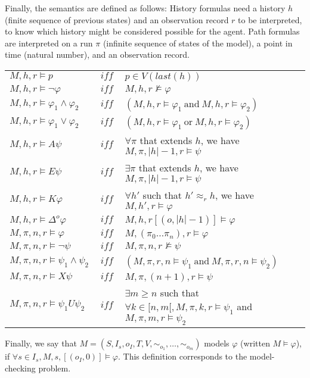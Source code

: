 \documentclass[dvipsnames]{acmart}
\def\A{\mathit{A}}
\def\E{\mathit{E}}
\def\U{\mathit{U}}
\def\X{\mathit{X}}
\def\K{\mathit{K}}
\def\D#1{\Delta^{#1}}
\def\eqh#1{\approx_{#1}}
\def\eqstate#1{\sim_{#1}}
\def\iff{\ \mathit{iff}\ }
\begin{document}
Finally, the semantics are defined as follows:
History formulas need a history $h$ (finite sequence of previous states) and an observation record $r$ to be interpreted, to know which history might be considered possible for the agent.
Path formulas are interpreted on a run $\pi$ (infinite sequence of states of the model), a point in time (natural number), and an observation record.
\begin{table}
\begin{tabular}{l c l}
  $M,h,r \models p $&$ \iff $&$ p\in V(\mathit{last}(h))$\\
  $M,h,r \models \neg\varphi $&$ \iff $&$ M,h,r\not\models\varphi$\\
  $M,h,r \models \varphi_1\wedge\varphi_2 $&$ \iff $&$ (M,h,r\models\varphi_1~\text{and}~ M,h,r\models\varphi_2)$\\
  $M,h,r \models \varphi_1\vee\varphi_2 $&$ \iff $&$ (M,h,r\models\varphi_1~\text{or}~ M,h,r\models\varphi_2)$\\
  $M,h,r \models \A\psi  $&$ \iff $&$ \forall\pi$ that extends $h$, we have $M,\pi,|h|-1,r\models\psi$\\
  $M,h,r \models \E\psi  $&$ \iff $&$ \exists\pi$ that extends $h$, we have $M,\pi,|h|-1,r\models\psi$\\
  $M,h,r \models\K\varphi  $&$ \iff $&$ \forall h'$ such that $h'\eqh{r}h$, we have $M,h',r\models\varphi$\\
  $M,h,r \models \D{o}\varphi $&$ \iff $&$ M,h,r[(o,|h|-1)]\models\varphi$\\
  $M,\pi,n,r\models\varphi $&$ \iff $&$ M,(\pi_0\dots\pi_n),r\models\varphi$\\
  $M,\pi,n,r\models\neg\psi $&$ \iff $&$ M,\pi,n,r\not\models\psi$\\
  $M,\pi,n,r\models \psi_1\wedge\psi_2 $&$ \iff $&$ (M,\pi,r,n\models\psi_1~\text{and}~ M,\pi,r,n\models\psi_2)$\\
  $M,\pi,n,r\models\X\psi $&$ \iff $&$  M,\pi,(n+1),r\models\psi$\\
  $M,\pi,n,r\models \psi_1\U\psi_2 $&$ \iff $&$ \exists m\geq n$ such that $\forall k\in[n,m[, M,\pi,k,r\models\psi_1$ and $M,\pi,m,r\models\psi_2$\\
\end{tabular}
\end{table}

Finally, we say that $M=(S,I_s,o_I,T,V,\eqstate{o_1},\dots,\eqstate{o_m})$ models $\varphi$ (written $M\models\varphi$), if $\forall s\in I_s, M,s,[(o_I,0)]\models\varphi$. This definition corresponds to the model-checking problem.
\end{document}
